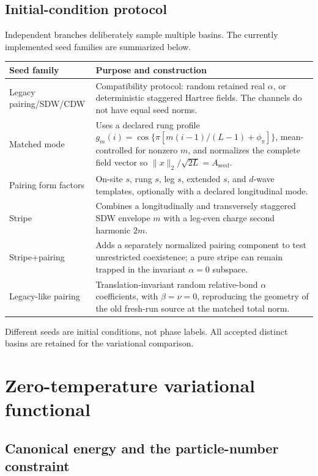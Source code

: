 \documentclass[11pt]{article}
\begin{document}
\subsection{Initial-condition protocol}

Independent branches deliberately sample multiple basins.  The currently
implemented seed families are summarized below.
\begin{center}
\begin{tabularx}{\textwidth}{p{}X}
\toprule
Seed family & Purpose and construction \\
\midrule
Legacy pairing/SDW/CDW
& Compatibility protocol: random retained real \(\alpha\), or deterministic
  staggered Hartree fields.  The channels do not have equal seed norms. \\
Matched mode
& Uses a declared rung profile
  \(g_m(i)=\cos\{\pi[m(i-1)/(L-1)+\phi_\pi]\}\), mean-controlled for nonzero \(m\),
  and normalizes the complete field vector so
  \(\|x\|_2/\sqrt{2L}=A_{\mathrm{seed}}\). \\
Pairing form factors
& On-site \(s\), rung \(s\), leg \(s\), extended \(s\), and \(d\)-wave
  templates, optionally with a declared longitudinal mode. \\
Stripe
& Combines a longitudinally and transversely staggered SDW envelope \(m\)
  with a leg-even charge second harmonic \(2m\). \\
Stripe+pairing
& Adds a separately normalized pairing component to test unrestricted
  coexistence; a pure stripe can remain trapped in the invariant
  \(\alpha=0\) subspace. \\
Legacy-like pairing
& Translation-invariant random relative-bond \(\alpha\) coefficients, with
  \(\beta=\nu=0\), reproducing the geometry of the old fresh-run source at the
  matched total norm. \\
\bottomrule
\end{tabularx}
\end{center}
Different seeds are initial conditions, not phase labels.  All accepted
distinct basins are retained for the variational comparison.

\section{Zero-temperature variational functional}
\label{sec:variational}

\subsection{Canonical energy and the particle-number constraint}
\end{document}
